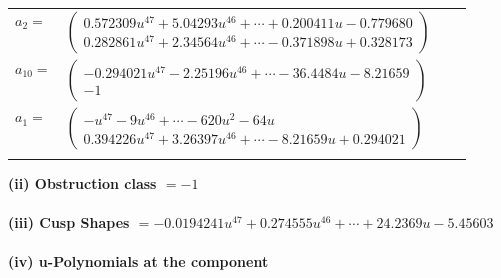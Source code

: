 \documentclass[1p]{elsarticle_modified}
\theoremstyle{definition}
\begin{document}
\begin{tabular}{m{7pt} m{180pt} m{7pt} m{180pt} }
\flushright $a_{2}=$&$\begin{pmatrix}0.572309 u^{47}+5.04293 u^{46}+\cdots+0.200411 u-0.779680\\0.282861 u^{47}+2.34564 u^{46}+\cdots-0.371898 u+0.328173\end{pmatrix}$ \\
\flushright $a_{10}=$&$\begin{pmatrix}-0.294021 u^{47}-2.25196 u^{46}+\cdots-36.4484 u-8.21659\\-1\end{pmatrix}$ \\
\flushright $a_{1}=$&$\begin{pmatrix}- u^{47}-9 u^{46}+\cdots-620 u^2-64 u\\0.394226 u^{47}+3.26397 u^{46}+\cdots-8.21659 u+0.294021\end{pmatrix}$\\&\end{tabular}
\flushleft \textbf{(ii) Obstruction class $= -1$}\\~\\
\flushleft \textbf{(iii) Cusp Shapes $= -0.0194241 u^{47}+0.274555 u^{46}+\cdots+24.2369 u-5.45603$}\\~\\
\newpage\renewcommand{\arraystretch}{1}
\flushleft \textbf{(iv) u-Polynomials at the component}\newline \\
\end{document}
